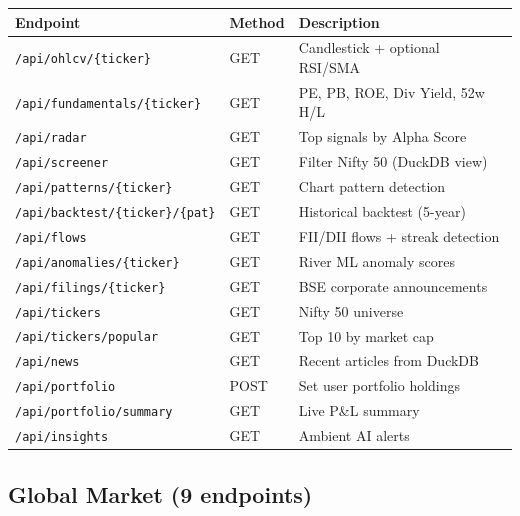 \documentclass[11pt, a4paper]{article}
\begin{document}
\begin{center}
\scriptsize
\begin{tabular}{L{5.2cm} C{1.2cm} L{6.8cm}}
  \toprule
  \textbf{Endpoint} & \textbf{Method} & \textbf{Description} \\
  \midrule
  \texttt{/api/ohlcv/\{ticker\}}           & GET  & Candlestick + optional RSI/SMA \\
  \texttt{/api/fundamentals/\{ticker\}}    & GET  & PE, PB, ROE, Div Yield, 52w H/L \\
  \texttt{/api/radar}                      & GET  & Top signals by Alpha Score \\
  \texttt{/api/screener}                   & GET  & Filter Nifty 50 (DuckDB view) \\
  \texttt{/api/patterns/\{ticker\}}        & GET  & Chart pattern detection \\
  \texttt{/api/backtest/\{ticker\}/\{pat\}}& GET  & Historical backtest (5-year) \\
  \texttt{/api/flows}                      & GET  & FII/DII flows + streak detection \\
  \texttt{/api/anomalies/\{ticker\}}       & GET  & River ML anomaly scores \\
  \texttt{/api/filings/\{ticker\}}         & GET  & BSE corporate announcements \\
  \texttt{/api/tickers}                    & GET  & Nifty 50 universe \\
  \texttt{/api/tickers/popular}            & GET  & Top 10 by market cap \\
  \texttt{/api/news}                       & GET  & Recent articles from DuckDB \\
  \texttt{/api/portfolio}                  & POST & Set user portfolio holdings \\
  \texttt{/api/portfolio/summary}          & GET  & Live P\&L summary \\
  \texttt{/api/insights}                   & GET  & Ambient AI alerts \\
  \bottomrule
\end{tabular}
\end{center}

\subsection{Global Market (9 endpoints)}
\end{document}
